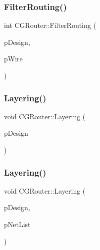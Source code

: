 \mbox{\label{classCGRouter_ae04faf8e6971cdf55b7314471369e61e}} 
\subsubsection{\texorpdfstring{FilterRouting()}{FilterRouting()}}
{\footnotesize\ttfamily int C\+G\+Router\+::\+Filter\+Routing (\begin{DoxyParamCaption}\item[{\mbox{\hyperlink{classCDesign}{C\+Design}} $\ast$}]{p\+Design,  }\item[{\mbox{\hyperlink{classCWire}{C\+Wire}} $\ast$}]{p\+Wire }\end{DoxyParamCaption})\hspace{0.3cm}{\ttfamily [static]}}

\mbox{\label{classCGRouter_af52c3a9802eff8e543e13a643e5de83a}} 
\subsubsection{\texorpdfstring{Layering()}{Layering()}\hspace{0.1cm}{\footnotesize\ttfamily [1/3]}}
{\footnotesize\ttfamily void C\+G\+Router\+::\+Layering (\begin{DoxyParamCaption}\item[{\mbox{\hyperlink{classCDesign}{C\+Design}} $\ast$}]{p\+Design }\end{DoxyParamCaption})\hspace{0.3cm}{\ttfamily [static]}}

\mbox{\label{classCGRouter_ab3aa19892e106aedd7bdceb6ed966200}} 
\subsubsection{\texorpdfstring{Layering()}{Layering()}\hspace{0.1cm}{\footnotesize\ttfamily [2/3]}}
{\footnotesize\ttfamily void C\+G\+Router\+::\+Layering (\begin{DoxyParamCaption}\item[{\mbox{\hyperlink{classCDesign}{C\+Design}} $\ast$}]{p\+Design,  }\item[{vector$<$ \mbox{\hyperlink{classCNet}{C\+Net}} $\ast$ $>$ $\ast$}]{p\+Net\+List }\end{DoxyParamCaption})\hspace{0.3cm}{\ttfamily [static]}}

